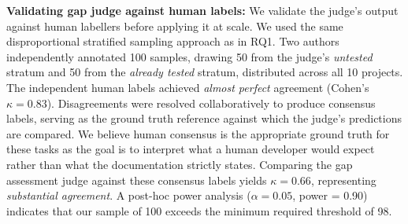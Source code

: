 \smallskip
\noindent\textbf{Validating gap judge against human labels:}
We validate the judge's output against human labellers before applying it at scale. 
We used the same disproportional stratified sampling approach as in RQ1. 
Two authors independently annotated 100 samples, drawing 50 from the judge's \textit{untested} stratum and 50 from the \textit{already tested} stratum, distributed across all 10 projects. 
The independent human labels achieved \emph{almost perfect} agreement (Cohen's $\kappa=0.83$).
Disagreements were resolved collaboratively to produce consensus labels, serving as the ground truth reference against which the judge's predictions are compared. 
We believe human consensus is the appropriate ground truth for these tasks as the goal is to interpret what a human developer would expect rather than what the documentation strictly states.
Comparing the gap assessment judge against these consensus labels yields $\kappa=0.66$, representing \emph{substantial agreement}. 
A post-hoc power analysis ($\alpha=0.05$, power = 0.90) indicates that our sample of 100 exceeds the minimum required threshold of 98. %



